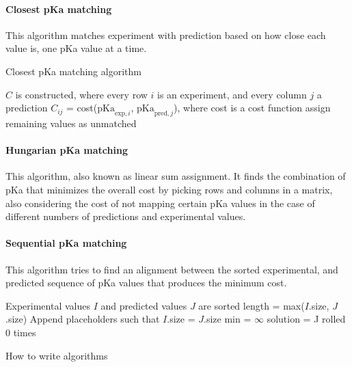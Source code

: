 \documentclass[9pt,lineno]{elife}
\newcommand{\pKa}{\mathrm{pKa}}
\begin{document}
\paragraph{Closest pKa matching}
This algorithm matches experiment with prediction based on how close each value is, one pKa value at a time.
%

\begin{algorithm}[H]
\SetAlgoLined
\caption{Closest pKa matching algorithm}
 
 $C$ is constructed, where every row  $i$ is an experiment, and every column $j$ a prediction\;
 $C_{ij}$ = cost($\pKa_{\text{exp},i}$, $\pKa_{\text{pred},j}$), where cost is a cost function\;
 assign remaining values as unmatched\;
\end{algorithm}

%
\paragraph{Hungarian pKa matching}
This algorithm, also known as linear sum assignment.
%
It finds the combination of pKa that minimizes the overall cost by picking rows and columns in a matrix, also considering the cost of not mapping certain pKa values in the case of different numbers of predictions and experimental values.
%
\paragraph{Sequential pKa matching}
This algorithm tries to find an alignment between the sorted experimental, and predicted sequence of pKa values that produces the minimum cost.

\begin{algorithm}[H]
\SetAlgoLined
{}
 Experimental values $I$ and predicted values $J$ are sorted\;
 length = max($I$.size, $J$.size)\;
 Append placeholders such that $I$.size = $J$.size\;
 min = $\infty$\;
 solution = J rolled 0 times\;
 \caption{How to write algorithms}
\end{algorithm}
\end{document}
